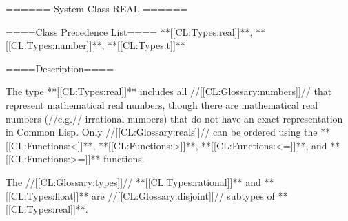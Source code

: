 ====== System Class REAL ======

====Class Precedence List==== **[[CL:Types:real]]**, **[[CL:Types:number]]**, **[[CL:Types:t]]**

====Description====

The type **[[CL:Types:real]]** includes all //[[CL:Glossary:numbers]]// that represent mathematical real numbers, though there are mathematical real numbers (//e.g.// irrational numbers) that do not have an exact representation in Common Lisp. Only //[[CL:Glossary:reals]]// can be ordered using the **[[CL:Functions:<]]**, **[[CL:Functions:>]]**, **[[CL:Functions:<=]]**, and **[[CL:Functions:>=]]** functions.

The //[[CL:Glossary:types]]// **[[CL:Types:rational]]** and **[[CL:Types:float]]** are //[[CL:Glossary:disjoint]]// subtypes of **[[CL:Types:real]]**.


 
